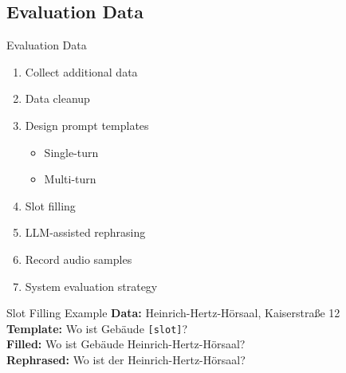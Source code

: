\documentclass{sdqbeamer}[smallfoot]
\begin{document}
\subsection{Evaluation Data}
\begin{frame}{Evaluation Data}
    \begin{multicols}{2}
        \begin{enumerate}
            \item Collect additional data
            \item Data cleanup
            \item Design prompt templates
                \begin{itemize}
                    \item Single-turn
                    \item Multi-turn
                \end{itemize}
            \item Slot filling
            \item LLM-assisted rephrasing
            \item Record audio samples
            \item System evaluation strategy
        \end{enumerate}

    \columnbreak
    \begin{minipage}{0.9\linewidth}
	\begin{greenblock}{Slot Filling Example}
            \textbf{Data:} Heinrich-Hertz-Hörsaal, Kaiserstraße 12\\
		\textbf{Template:} Wo ist Gebäude \texttt{[slot]}?\\
            \textbf{Filled:} Wo ist Gebäude Heinrich-Hertz-Hörsaal?\\
            \textbf{Rephrased:} Wo ist der Heinrich-Hertz-Hörsaal?\\
        \end{greenblock}
    \end{minipage}
    \end{multicols}
\end{frame}
\end{document}
